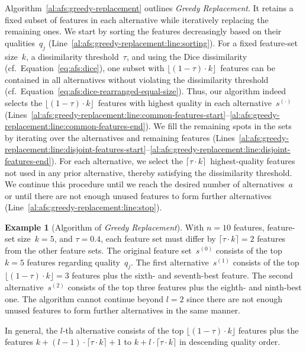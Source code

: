 \documentclass{article}
\theoremstyle{definition}
\newtheorem{example}{Example}
\begin{document}
Algorithm~\ref{al:afs:greedy-replacement} outlines \emph{Greedy Replacement}.
It retains a fixed subset of features in each alternative while iteratively replacing the remaining ones.
We start by sorting the features decreasingly based on their qualities~$q_j$ (Line~\ref{al:afs:greedy-replacement:line:sorting}).
For a fixed feature-set size~$k$, a dissimilarity threshold~$\tau$, and using the Dice dissimilarity (cf.~Equation~\ref{eq:afs:dice}), one subset with $\lfloor (1 - \tau) \cdot k \rfloor$~features can be contained in all alternatives without violating the dissimilarity threshold (cf.~Equation~\ref{eq:afs:dice-rearranged-equal-size}).
Thus, our algorithm indeed selects the $\lfloor (1 - \tau) \cdot k \rfloor$~features with highest quality in each alternative~$s^{(\cdot)}$ (Lines~\ref{al:afs:greedy-replacement:line:common-features-start}--\ref{al:afs:greedy-replacement:line:common-features-end}).
We fill the remaining spots in the sets by iterating over the alternatives and remaining features (Lines~\ref{al:afs:greedy-replacement:line:disjoint-features-start}--\ref{al:afs:greedy-replacement:line:disjoint-features-end}).
For each alternative, we select the $\lceil \tau \cdot k \rceil$~highest-quality features not used in any prior alternative, thereby satisfying the dissimilarity threshold.
We continue this procedure until we reach the desired number of alternatives~$a$ or until there are not enough unused features to form further alternatives (Line~\ref{al:afs:greedy-replacement:line:stop}).
%
\begin{example}[Algorithm of \emph{Greedy Replacement}]
	With $n=10$ features, feature-set size~$k=5$, and $\tau=0.4$, each feature set must differ by $\lceil \tau \cdot k \rceil = 2$ features from the other feature sets.
	The original feature set~$s^{(0)}$ consists of the top $k=5$ features regarding quality~$q_j$.
	The first alternative~$s^{(1)}$ consists of the top $\lfloor (1 - \tau) \cdot k \rfloor = 3$ features plus the sixth- and seventh-best feature.
	The second alternative~$s^{(2)}$ consists of the top three features plus the eighth- and ninth-best one.
	The algorithm cannot continue beyond $l=2$ since there are not enough unused features to form further alternatives in the same manner.
	\label{ex:afs:greedy-replacement:algorithm}
\end{example}
%
In general, the $l$-th alternative consists of the top $\lfloor (1 - \tau) \cdot k \rfloor$ features plus the features $k + (l-1) \cdot \lceil \tau \cdot k \rceil + 1$ to $k + l \cdot \lceil \tau \cdot k \rceil$ in descending quality order.
\end{document}
